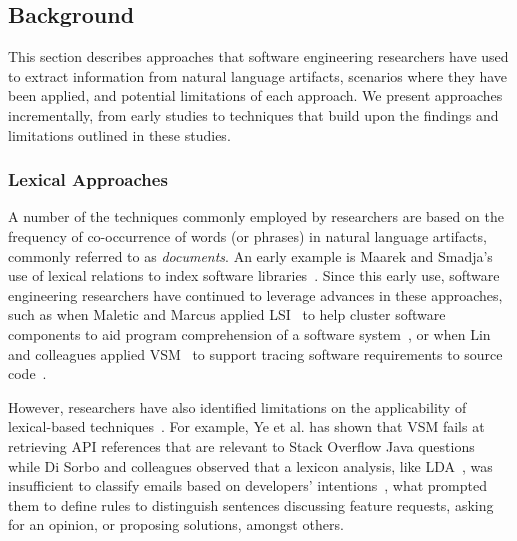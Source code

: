 
\subsection{Background}
\label{cp5:background}




This section describes approaches that software engineering researchers have used to extract information from natural language artifacts, scenarios where they have been applied, and potential limitations of each approach. We present approaches incrementally, from early studies to techniques that build upon the findings
and limitations outlined in these studies.



\subsubsection{Lexical Approaches}


A number of the techniques commonly employed by researchers are based on the
frequency of co-occurrence of words (or phrases) in natural language artifacts, commonly referred to as \textit{documents}. 
An early example is Maarek and Smadja's use of lexical relations to index
software libraries~\cite{maarek1989}. 
Since this early use, software engineering
researchers have continued to leverage advances in
these approaches, such as when 
Maletic and Marcus applied \acf{LSI}~\cite{deerwester1990LSI} to help cluster software components to aid
program comprehension of a software system~\cite{Marcus2003}, or when Lin and colleagues
applied \acf{VSM}~\cite{salton1975vector}
to support tracing software requirements to source code~\cite{Lin2021}.



However, researchers have also identified limitations on the applicability of lexical-based techniques~\cite{silva2019, Ye2016, Sorbo2015}. For example, Ye et al. has shown that \acs{VSM} 
fails at retrieving API references that are relevant to Stack Overflow Java questions~\cite{Ye2016} while
Di Sorbo and colleagues observed that a lexicon analysis, like \acs{LDA}~\cite{blei2003latent}, was insufficient to classify emails based on developers' intentions~\cite{Sorbo2015}, what prompted them 
to define rules to
distinguish sentences discussing feature requests, asking for an
opinion, or proposing solutions, amongst others.



